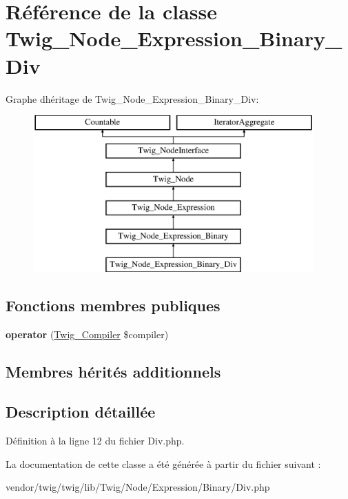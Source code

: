 \hypertarget{class_twig___node___expression___binary___div}{}\section{Référence de la classe Twig\+\_\+\+Node\+\_\+\+Expression\+\_\+\+Binary\+\_\+\+Div}
\label{class_twig___node___expression___binary___div}
Graphe d\textquotesingle{}héritage de Twig\+\_\+\+Node\+\_\+\+Expression\+\_\+\+Binary\+\_\+\+Div\+:\begin{figure}[H]
\begin{center}
\leavevmode
\includegraphics[height=6.000000cm]{class_twig___node___expression___binary___div}
\end{center}
\end{figure}
\subsection*{Fonctions membres publiques}
\begin{DoxyCompactItemize}
\item 
{\bfseries operator} (\hyperlink{class_twig___compiler}{Twig\+\_\+\+Compiler} \$compiler)\hypertarget{class_twig___node___expression___binary___div_af77318ec88d5f8a508684970a150b670}{}\label{class_twig___node___expression___binary___div_af77318ec88d5f8a508684970a150b670}

\end{DoxyCompactItemize}
\subsection*{Membres hérités additionnels}


\subsection{Description détaillée}


Définition à la ligne 12 du fichier Div.\+php.



La documentation de cette classe a été générée à partir du fichier suivant \+:\begin{DoxyCompactItemize}
\item 
vendor/twig/twig/lib/\+Twig/\+Node/\+Expression/\+Binary/Div.\+php\end{DoxyCompactItemize}
